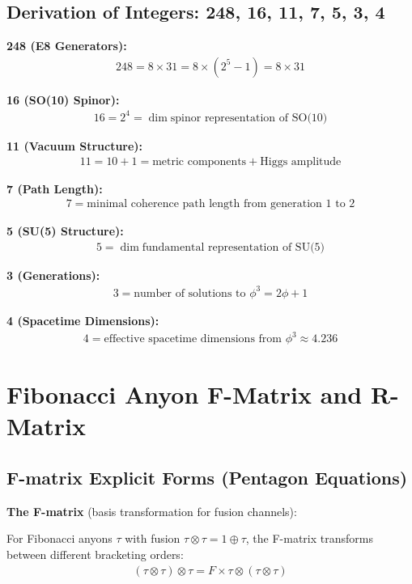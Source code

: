 \documentclass[11pt]{article}
\theoremstyle{definition}
\newcommand{\goldenratio}{\phi}
\begin{document}
\subsection{Derivation of Integers: 248, 16, 11, 7, 5, 3, 4}

\textbf{248 (E8 Generators):}
\begin{align}
248 = 8 \times 31 = 8 \times (2^5 - 1) = 8 \times 31
\end{align}

\textbf{16 (SO(10) Spinor):}
\begin{align}
16 = 2^4 = \dim \text{spinor representation of SO(10)}
\end{align}

\textbf{11 (Vacuum Structure):}
\begin{align}
11 = 10 + 1 = \text{metric components} + \text{Higgs amplitude}
\end{align}

\textbf{7 (Path Length):}
\begin{align}
7 = \text{minimal coherence path length from generation 1 to 2}
\end{align}

\textbf{5 (SU(5) Structure):}
\begin{align}
5 = \dim \text{fundamental representation of SU(5)}
\end{align}

\textbf{3 (Generations):}
\begin{align}
3 = \text{number of solutions to } \goldenratio^3 = 2\goldenratio + 1
\end{align}

\textbf{4 (Spacetime Dimensions):}
\begin{align}
4 = \text{effective spacetime dimensions from } \goldenratio^3 \approx 4.236
\end{align}

\section{Fibonacci Anyon F-Matrix and R-Matrix}

\subsection{F-matrix Explicit Forms (Pentagon Equations)}

\textbf{The F-matrix} (basis transformation for fusion channels):

For Fibonacci anyons $\tau$ with fusion $\tau \otimes \tau = 1 \oplus \tau$, the F-matrix transforms between different bracketing orders:
\begin{align}
(\tau \otimes \tau) \otimes \tau = F \times \tau \otimes (\tau \otimes \tau)
\end{align}
\end{document}
